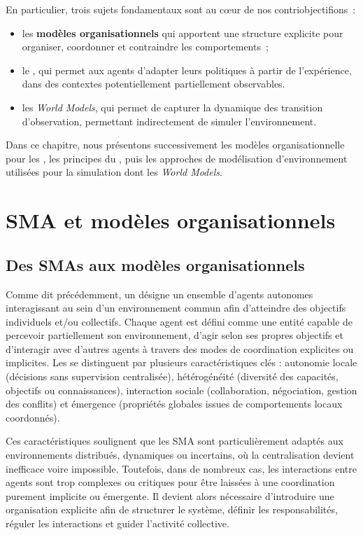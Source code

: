 En particulier, trois sujets fondamentaux sont au cœur de nos contriobjectifions~:
\begin{itemize}
  \item les \textbf{modèles organisationnels} qui apportent une structure explicite pour organiser, coordonner et contraindre les comportements~;
  \item le , qui permet aux agents d'adapter leurs politiques à partir de l'expérience, dans des contextes potentiellement partiellement observables.
  \item les \textit{World Models}, qui permet de capturer la dynamique des transition d'observation, permettant indirectement de simuler l'environnement.
\end{itemize}

Dans ce chapitre, nous présentons successivement les modèles organisationnelle pour les , les principes du , puis les approches de modélisation d'environnement utilisées pour la simulation dont les \textit{World Models}.


\section{SMA et modèles organisationnels}

\subsection{Des SMAs aux modèles organisationnels}

Comme dit précédemment, un  désigne un ensemble d'agents autonomes interagissant au sein d'un environnement commun afin d'atteindre des objectifs individuels et/ou collectifs. Chaque agent est défini comme une entité capable de percevoir partiellement son environnement, d'agir selon ses propres objectifs et d'interagir avec d'autres agents à travers des modes de coordination explicites ou implicites. Les  se distinguent par plusieurs caractéristiques clés : autonomie locale (décisions sans supervision centralisée), hétérogénéité (diversité des capacités, objectifs ou connaissances), interaction sociale (collaboration, négociation, gestion des conflits) et émergence (propriétés globales issues de comportements locaux coordonnés).

Ces caractéristiques soulignent que les SMA sont particulièrement adaptés aux environnements distribués, dynamiques ou incertains, où la centralisation devient inefficace voire impossible. Toutefois, dans de nombreux cas, les interactions entre agents sont trop complexes ou critiques pour être laissées à une coordination purement implicite ou émergente. Il devient alors nécessaire d’introduire une organisation explicite afin de structurer le système, définir les responsabilités, réguler les interactions et guider l’activité collective.

